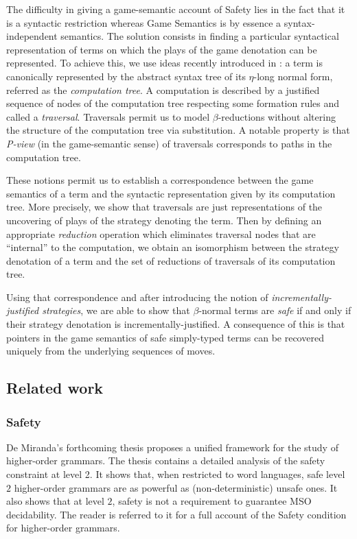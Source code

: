\documentclass{llncs}
\begin{document}
The difficulty in giving a game-semantic account of Safety lies in
the fact that it is a syntactic restriction whereas Game Semantics
is by essence a syntax-independent semantics. The solution consists
in finding a particular syntactical representation of terms on which
the plays of the game denotation can be represented.
To achieve this, we use ideas recently introduced in \cite{OngLics2006}: a term
is canonically represented by the abstract syntax tree of its
$\eta$-long normal form, referred as the \emph{computation tree}. A
computation is described by a justified sequence of nodes of the
computation tree respecting some formation rules and called a
\emph{traversal}. Traversals permit us to model $\beta$-reductions
without altering the structure of the computation tree via
substitution. A notable property is that \emph{P-view} (in the game-semantic sense) of traversals
corresponds to paths in the computation tree.

These notions permit us to establish a correspondence between the game semantics of a term and
the syntactic representation given by its computation tree.
More precisely, we show that traversals are just representations of the
uncovering of plays of the strategy denoting the term.
Then by defining an appropriate \emph{reduction} operation which eliminates traversal
nodes that are ``internal'' to the computation, we obtain an
isomorphism between the strategy denotation of a term and the set of
reductions of traversals of its computation tree.



Using that correspondence and after introducing the notion of \emph{incrementally-justified
strategies}, we are able to show that $\beta$-normal terms are \emph{safe} if and only if
their strategy denotation is incrementally-justified.
A consequence of this is that pointers in the game semantics of safe simply-typed terms can be recovered uniquely from the underlying sequences of moves.

\vspace{1cm}

\subsection{Related work}

\subsubsection{Safety}

De Miranda's forthcoming thesis \cite{demirandathesis} proposes a unified framework for the study of higher-order grammars. The thesis contains a detailed analysis of the safety constraint at level 2. It shows that, when restricted to word languages, safe level $2$ higher-order grammars are as powerful as (non-deterministic) unsafe ones. It also shows that at level $2$, safety is not a requirement to guarantee MSO decidability. The reader is referred to it for a full account of the Safety condition for higher-order grammars.
\end{document}
